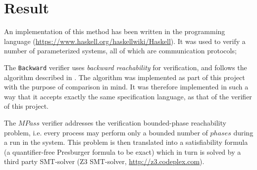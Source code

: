 \section{Result}
An implementation of this method has been written in the  programming language (\url{https://www.haskell.org/haskellwiki/Haskell}). It was used to verify a number of parameterized systems, all of which are communication protocols;

\vspace{10pt}
\vspace{10pt}

The \texttt{Backward} verifier uses \emph{backward reachability} for verification, and follows the algorithm described in \cite{287591}. The algorithm was implemented as part of this project with the purpose of comparison in mind. It was therefore implemented in such a way that it accepts exactly the same specification language, as that of the verifier of this project.

The $MPass$ verifier addresses the verification bounded-phase reachability problem, i.e. every process may perform only a bounded number of $phases$ during a run in the system. This problem is then translated into a satisfiability formula (a quantifier-free Presburger formula to be exact) which in turn is solved by a third party SMT-solver (Z3 SMT-solver, \url{http://z3.codeplex.com}).

